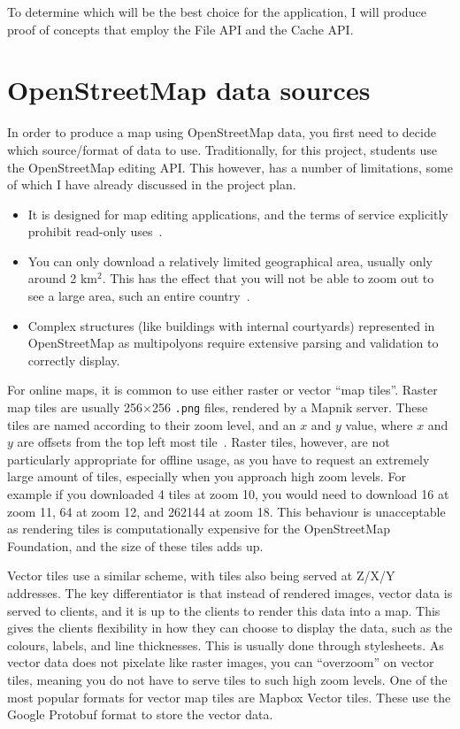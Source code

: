 \documentclass[]{final_report}
\begin{document}
To determine which will be the best choice for the application, I will produce proof of concepts that employ the File API and the Cache API\@.

\chapter{OpenStreetMap data sources}

In order to produce a map using OpenStreetMap data, you first need to decide which source/format of data to use. Traditionally, for this project, students use the OpenStreetMap editing API\@. This however, has a number of limitations, some of which I have already discussed in the project plan.

\begin{itemize}
    \item It is designed for map editing applications, and the terms of service explicitly prohibit read-only uses~\cite{OSMF-tile-usage-policy}.
    \item You can only download a relatively limited geographical area, usually only around 2 km\(^2\). This has the effect that you will not be able to zoom out to see a large area, such an entire country~\cite{osm-wiki-limited-area}.
    \item Complex structures (like buildings with internal courtyards) represented in OpenStreetMap as multipolyons require extensive parsing and validation to correctly display.
\end{itemize}

For online maps, it is common to use either raster or vector ``map tiles''. Raster map tiles are usually 256\(\times{}\)256 \texttt{.png} files, rendered by a Mapnik server. These tiles are named according to their zoom level, and an \(x\) and \(y\) value, where \(x\) and \(y\) are offsets from the top left most tile~\cite{osm-wiki-tile-names}. Raster tiles, however, are not particularly appropriate for offline usage, as you have to request an extremely large amount of tiles, especially when you approach high zoom levels. For example if you downloaded 4 tiles at zoom 10, you would need to download 16 at zoom 11, 64 at zoom 12, and 262144 at zoom 18. This behaviour is unacceptable as rendering tiles is computationally expensive for the OpenStreetMap Foundation, and the size of these tiles adds up.

Vector tiles use a similar scheme, with tiles also being served at Z/X/Y addresses. The key differentiator is that instead of rendered images, vector data is served to clients, and it is up to the clients to render this data into a map. This gives the clients flexibility in how they can choose to display the data, such as the colours, labels, and line thicknesses. This is usually done through stylesheets. As vector data does not pixelate like raster images, you can ``overzoom'' on vector tiles, meaning you do not have to serve tiles to such high zoom levels. One of the most popular formats for vector map tiles are Mapbox Vector tiles. These use the Google Protobuf format to store the vector data.
\end{document}
